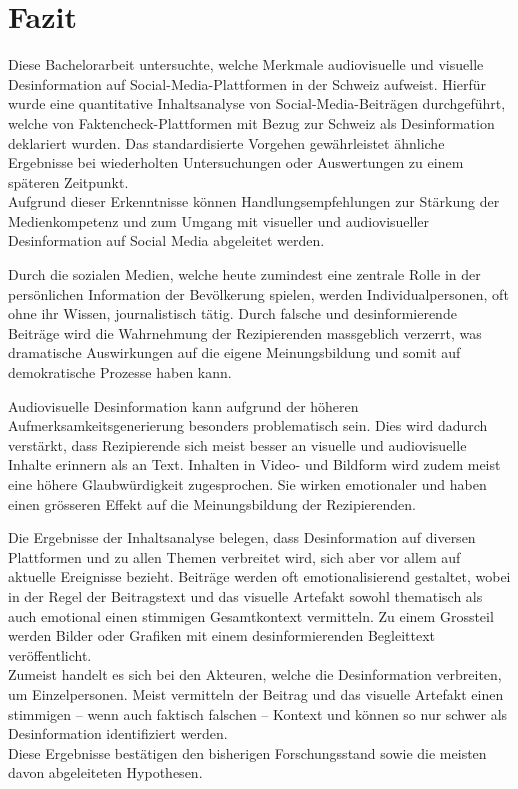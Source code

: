 \documentclass[12pt,a4paper]{article}        %
\begin{document}
\section{Fazit}
Diese Bachelorarbeit untersuchte, welche Merkmale audiovisuelle und visuelle Desinformation auf Social-Media-Plattformen in der Schweiz aufweist. Hierfür wurde eine quantitative Inhaltsanalyse von Social-Media-Beiträgen durchgeführt, welche von Faktencheck-Plattformen mit Bezug zur Schweiz als Desinformation deklariert wurden. Das standardisierte Vorgehen gewährleistet ähnliche Ergebnisse bei wiederholten Untersuchungen oder Auswertungen zu einem späteren Zeitpunkt.\\
Aufgrund dieser Erkenntnisse können Handlungsempfehlungen zur Stärkung der Medienkompetenz und zum Umgang mit visueller und audiovisueller Desinformation auf Social Media abgeleitet werden.

Durch die sozialen Medien, welche heute zumindest eine zentrale Rolle in der persönlichen Information der Bevölkerung spielen, werden Individualpersonen, oft ohne ihr Wissen, journalistisch tätig. Durch falsche und desinformierende Beiträge wird die Wahrnehmung der Rezipierenden massgeblich verzerrt, was dramatische Auswirkungen auf die eigene Meinungsbildung und somit auf demokratische Prozesse haben kann.

Audiovisuelle Desinformation kann aufgrund der höheren Aufmerksamkeitsgenerierung besonders problematisch sein. Dies wird dadurch verstärkt, dass Rezipierende sich meist besser an visuelle und audiovisuelle Inhalte erinnern als an Text. Inhalten in Video- und Bildform wird zudem meist eine höhere Glaubwürdigkeit zugesprochen. Sie wirken emotionaler und haben einen grösseren Effekt auf die Meinungsbildung der Rezipierenden.

Die Ergebnisse der Inhaltsanalyse belegen, dass Desinformation auf diversen Plattformen und zu allen Themen verbreitet wird, sich aber vor allem auf aktuelle Ereignisse bezieht. Beiträge werden oft emotionalisierend gestaltet, wobei in der Regel der Beitragstext und das visuelle Artefakt sowohl thematisch als auch emotional einen stimmigen Gesamtkontext vermitteln. Zu einem Grossteil werden Bilder oder Grafiken mit einem desinformierenden Begleittext veröffentlicht.\\
Zumeist handelt es sich bei den Akteuren, welche die Desinformation verbreiten, um Einzelpersonen. Meist vermitteln der Beitrag und das visuelle Artefakt einen stimmigen – wenn auch faktisch falschen – Kontext und können so nur schwer als Desinformation identifiziert werden.\\
Diese Ergebnisse bestätigen den bisherigen Forschungsstand sowie die meisten davon abgeleiteten Hypothesen.
\end{document}
